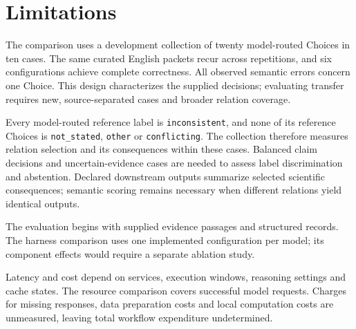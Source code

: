 \documentclass[11pt]{article}
\begin{document}
\section*{Limitations}

The comparison uses a development collection of twenty model-routed Choices in ten cases. The same curated English packets recur across repetitions, and six configurations achieve complete correctness. All observed semantic errors concern one Choice. This design characterizes the supplied decisions; evaluating transfer requires new, source-separated cases and broader relation coverage.

Every model-routed reference label is \texttt{inconsistent}, and none of its reference Choices is \texttt{not\_stated}, \texttt{other} or \texttt{conflicting}. The collection therefore measures relation selection and its consequences within these cases. Balanced claim decisions and uncertain-evidence cases are needed to assess label discrimination and abstention. Declared downstream outputs summarize selected scientific consequences; semantic scoring remains necessary when different relations yield identical outputs.

The evaluation begins with supplied evidence passages and structured records. The harness comparison uses one implemented configuration per model; its component effects would require a separate ablation study.

Latency and cost depend on services, execution windows, reasoning settings and cache states. The resource comparison covers successful model requests. Charges for missing responses, data preparation costs and local computation costs are unmeasured, leaving total workflow expenditure undetermined.



\appendix


\end{document}
